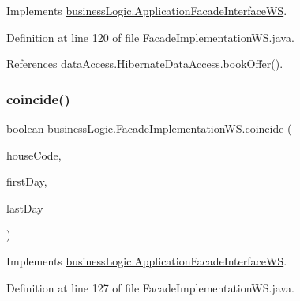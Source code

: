 Implements \mbox{\hyperlink{interfacebusinessLogic_1_1ApplicationFacadeInterfaceWS_a9f2916ad64674d13dbfbe58252e28531}{business\+Logic.\+Application\+Facade\+Interface\+WS}}.



Definition at line 120 of file Facade\+Implementation\+W\+S.\+java.


\begin{DoxyCode}{0}

\end{DoxyCode}


References data\+Access.\+Hibernate\+Data\+Access.\+book\+Offer().

\mbox{\label{classbusinessLogic_1_1FacadeImplementationWS_a6e8399739161cbb6a2830ebb9279de90}} 
\subsubsection{\texorpdfstring{coincide()}{coincide()}}
{\footnotesize\ttfamily boolean business\+Logic.\+Facade\+Implementation\+W\+S.\+coincide (\begin{DoxyParamCaption}\item[{\mbox{\hyperlink{classdomain_1_1RuralHouse}{Rural\+House}}}]{house\+Code,  }\item[{Date}]{first\+Day,  }\item[{Date}]{last\+Day }\end{DoxyParamCaption})}



Implements \mbox{\hyperlink{interfacebusinessLogic_1_1ApplicationFacadeInterfaceWS_aa56165d498ff54ccd651fe5ce9a50902}{business\+Logic.\+Application\+Facade\+Interface\+WS}}.



Definition at line 127 of file Facade\+Implementation\+W\+S.\+java.


\begin{DoxyCode}{0}

\end{DoxyCode}


